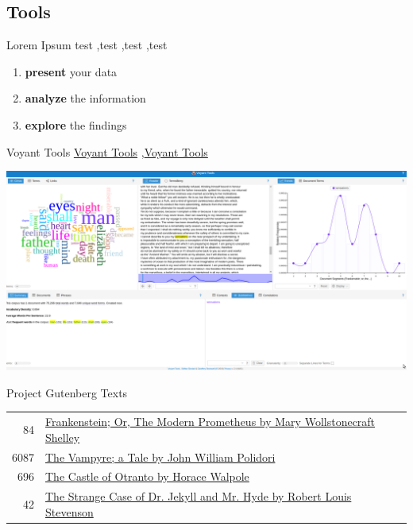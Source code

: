 \documentclass[10pt,a4paper]{article}
\begin{document}
\begin{multicols}{3}
	\section{Tools}

	\begin{textbox}{Lorem Ipsum}
		test  \sep test \sep test \sep test
		
		\bigskip
		
		\begin{enumerate}
			\item \textbf{present} your data
			\item \textbf{analyze} the information
			\item \textbf{explore} the findings
		\end{enumerate}
		
	\end{textbox}
	
	
	\begin{textbox}{Voyant Tools}
		\href{https://voyant-tools.org/}{Voyant Tools} \sep \href{https://voyant-tools.org/}{Voyant Tools}
		
		\includegraphics[width=\textwidth]{template-sample.assets/voyant.png}
	\end{textbox}
	
	\begin{textbox}{Project Gutenberg Texts}
		\begin{tabular}{r|p{}}\scriptsize
			84   & \href{http://www.gutenberg.org/ebooks/84}{Frankenstein; Or, The Modern Prometheus by Mary Wollstonecraft Shelley} \\
			6087 & \href{https://www.gutenberg.org/ebooks/6087}{The Vampyre; a Tale by John William Polidori}                        \\
			696  & \href{https://www.gutenberg.org/ebooks/696}{The Castle of Otranto by Horace Walpole}                              \\
			42   & \href{https://www.gutenberg.org/ebooks/42}{The Strange Case of Dr. Jekyll and Mr. Hyde by Robert Louis Stevenson} 
		\end{tabular}
		

\end{textbox}
\end{multicols}
\end{document}
